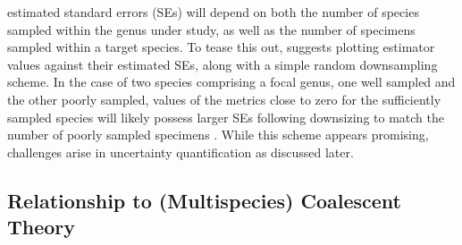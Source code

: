 \documentclass[12pt]{article}
\begin{document}
estimated standard errors (SEs) will depend on both the number of species sampled within the genus under study, as well as the number of specimens sampled within a target species. To tease this out, \citet{phillips2024measure} suggests plotting estimator values against their estimated SEs, along with a simple random downsampling scheme. In the case of two species comprising a focal genus, one well sampled and the other poorly sampled, values of the metrics close to zero for the sufficiently sampled species will likely possess larger SEs following downsizing to match the number of poorly sampled specimens \citep{phillips2024measure}. While this scheme appears promising, challenges arise in uncertainty quantification as discussed later.

\subsection{Relationship to (Multispecies) Coalescent Theory}
\end{document}
